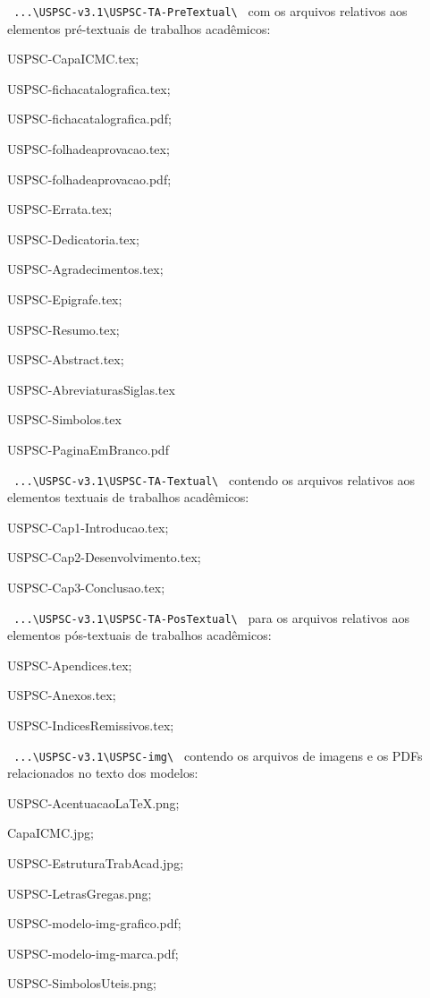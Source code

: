 \begin{alineas}
	\item \verb+ ...\USPSC-v3.1\USPSC-TA-PreTextual\ + com os arquivos relativos aos elementos pr\'e-textuais de trabalhos acad\^emicos:
		\begin{alineas}
				\item USPSC-CapaICMC.tex;
				\item USPSC-fichacatalografica.tex;
				\item USPSC-fichacatalografica.pdf;
				\item USPSC-folhadeaprovacao.tex;
				\item USPSC-folhadeaprovacao.pdf;
				\item USPSC-Errata.tex;
				\item USPSC-Dedicatoria.tex;
				\item USPSC-Agradecimentos.tex;
				\item USPSC-Epigrafe.tex;
				\item USPSC-Resumo.tex;
				\item USPSC-Abstract.tex;
				\item USPSC-AbreviaturasSiglas.tex
				\item USPSC-Simbolos.tex 
				\item USPSC-PaginaEmBranco.pdf
			\end{alineas}
			
	\item \verb+ ...\USPSC-v3.1\USPSC-TA-Textual\ + contendo os arquivos relativos aos elementos textuais de trabalhos acad\^emicos:
		\begin{alineas}
			\item USPSC-Cap1-Introducao.tex;
			\item USPSC-Cap2-Desenvolvimento.tex;
			\item USPSC-Cap3-Conclusao.tex;
		\end{alineas}
		
	\item \verb+ ...\USPSC-v3.1\USPSC-TA-PosTextual\ + para os arquivos relativos aos elementos p\'os-textuais de trabalhos acad\^emicos:	
		\begin{alineas}
			\item USPSC-Apendices.tex;
			\item USPSC-Anexos.tex;
			\item USPSC-IndicesRemissivos.tex;
		\end{alineas}
	
	\item \verb+ ...\USPSC-v3.1\USPSC-img\ + contendo os arquivos de imagens e os PDFs relacionados no texto dos modelos: 
		\begin{alineas}	
			\item USPSC-AcentuacaoLaTeX.png;
			\item CapaICMC.jpg;
			\item USPSC-EstruturaTrabAcad.jpg;
			\item USPSC-LetrasGregas.png;
			\item USPSC-modelo-img-grafico.pdf;
			\item USPSC-modelo-img-marca.pdf;
			\item USPSC-SimbolosUteis.png;
		\end{alineas}	
	

\end{alineas}
